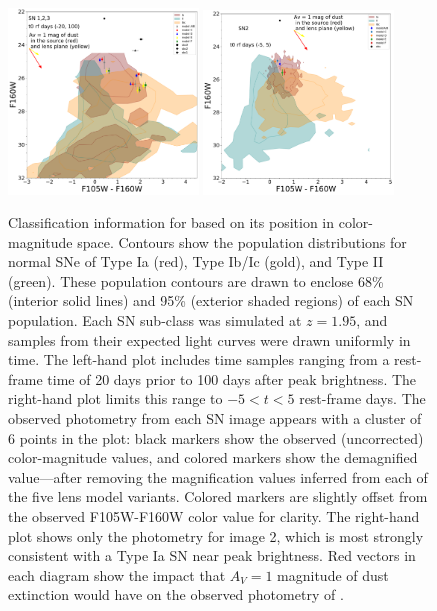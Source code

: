 \documentclass[twocolumn]{aastex63}
\begin{document}


\begin{figure}
    \centering
    \includegraphics[width=0.45\textwidth]{Images/color_mag_contours_all.pdf}
    \includegraphics[width=0.45\textwidth]{Images/color_mag_contours_image2.pdf}
    \caption{Classification information for \SNABC based on its position in color-magnitude space. Contours show the population distributions for normal SNe of Type Ia (red), Type Ib/Ic (gold), and Type II (green).  These population contours are drawn to enclose 68\% (interior solid lines) and 95\% (exterior shaded regions) of each SN population.  Each SN sub-class was simulated at $z=1.95$, and samples from their expected light curves were drawn uniformly in time. 
    The left-hand plot includes time samples ranging from a rest-frame time of 20 days prior to 100 days after peak brightness. The right-hand plot limits this range to $-5<t<5$ rest-frame days.    The observed photometry from each SN image appears with a cluster of 6 points in the plot: black markers show the observed (uncorrected) color-magnitude values, and colored markers show the demagnified value---after removing the magnification values inferred from each of the five lens model variants. Colored markers are slightly offset from the observed F105W-F160W color value for clarity.   The right-hand plot shows only the photometry for image 2, which is most strongly consistent with a Type Ia SN near peak brightness.   Red vectors in each diagram show the impact that $A_V=1$ magnitude of dust extinction would have on the observed photometry of \SNABC.  
    }
    \label{fig:colormag}
\end{figure}
\end{document}
